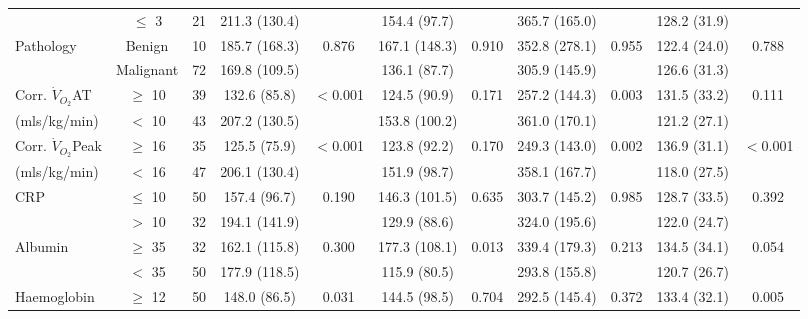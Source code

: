 \begin{sidewaystable}[p]
\begin{tabular}{|l c c | c c| c c | c c | c c|}
		                          & $\leq$ 3  & 21 & 211.3 (130.4) &                       & 154.4 (97.7)  &                   & 365.7 (165.0) &                & 128.2 (31.9) &  \\
		Pathology                 & Benign    & 10 & 185.7 (168.3) & 0.876                 & 167.1 (148.3) & 0.910             & 352.8 (278.1) & 0.955          & 122.4 (24.0) & 0.788                 \\
		                          & Malignant & 72 & 169.8 (109.5) &                       & 136.1 (87.7)  &                   & 305.9 (145.9) &                & 126.6 (31.3) &  \\
		Corr. $\dot{V}_{O_2}$AT   & $\geq$ 10 & 39 & 132.6 (85.8)  & $<$0.001              & 124.5 (90.9)  & 0.171             & 257.2 (144.3) & 0.003          & 131.5 (33.2) & 0.111                 \\
		(mls/kg/min)              & $<$ 10    & 43 & 207.2 (130.5) &                       & 153.8 (100.2) &                   & 361.0 (170.1) &                & 121.2 (27.1) &  \\
		Corr. $\dot{V}_{O_2}$Peak & $\geq$ 16 & 35 & 125.5 (75.9)  & $<$0.001              & 123.8 (92.2)  & 0.170             & 249.3 (143.0) & 0.002          & 136.9 (31.1) & $<$0.001              \\
		(mls/kg/min)              & $<$ 16    & 47 & 206.1 (130.4) &                       & 151.9 (98.7)  &                   & 358.1 (167.7) &                & 118.0 (27.5) &  \\
		CRP                       & $\leq$ 10 & 50 & 157.4 (96.7)  & 0.190                 & 146.3 (101.5) & 0.635             & 303.7 (145.2) & 0.985          & 128.7 (33.5) & 0.392                 \\
		                          & $>$ 10    & 32 & 194.1 (141.9) &                       & 129.9 (88.6)  &                   & 324.0 (195.6) &                & 122.0 (24.7) &  \\
		Albumin                   & $\geq$ 35 & 32 & 162.1 (115.8) & 0.300                 & 177.3 (108.1) & 0.013             & 339.4 (179.3) & 0.213          & 134.5 (34.1) & 0.054                 \\
		                          & $<$ 35    & 50 & 177.9 (118.5) &                       & 115.9 (80.5)  &                   & 293.8 (155.8) &                & 120.7 (26.7) &  \\
		Haemoglobin                       & $\geq$ 12 & 50 & 148.0 (86.5)  & 0.031                 & 144.5 (98.5)  & 0.704             & 292.5 (145.4) & 0.372          & 133.4 (32.1) & 0.005                 \\

\end{tabular}
\end{sidewaystable}
